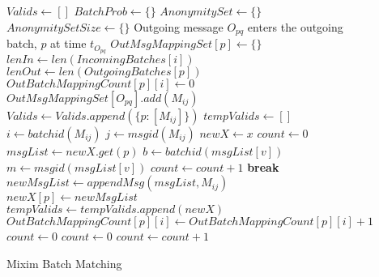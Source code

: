 \documentclass[twocolumn]{article}
\begin{document}
\begin{figure*}[p]
  \captionsetup{type=algorithm}
  \caption{Mixim Batch Matching}
  \begin{algorithmic}[1]
  \State $Valids \gets [] $
\State $BatchProb \gets \{ \} $
\State $ AnonymitySet \gets \{ \} $
\State $ AnonymitySetSize \gets \{ \} $
\State Outgoing message $O_{pq}$ enters the outgoing batch, $p$ at time $t_{O_{pq}}$
\State $OutMsgMappingSet [p] \gets \{ \} $
    \State $ lenIn \gets len(IncomingBatches[i]) $
    \State $ lenOut \gets len(OutgoingBatches[p]) $
        \State $OutBatchMappingCount[p][i] \gets 0 $
    \EndIf
\EndFor
{}
            \State $ OutMsgMappingSet[O_{pq}].add(M_{ij}) $
        \EndIf
    \EndFor
\EndFor
{}
        \State $Valids \gets Valids.append(\{ p: [M_{ij}] \} )$
    \EndFor
\Else
    \State $tempValids \gets []$
        \State $ i \gets batchid(M_{ij}) $
        \State $ j \gets msgid(M_{ij}) $
            \State $ newX \gets x $
            \State $count \gets 0$
            \State $ msgList \gets newX.get(p) $
                    \State $ b \gets batchid(msgList[v]) $
                    \State $ m \gets msgid(msgList[v]) $
                        \State $count \gets count + 1$
                    \Else
                        \State \textbf{break}
                    \EndIf
                \EndFor
                    \State $ newMsgList \gets appendMsg( msgList,M_{ij})$
                    \State $newX[p] \gets newMsgList $
                    \State $tempValids \gets tempValids.append(newX)$
                    \State $ OutBatchMappingCount[p][i] \gets OutBatchMappingCount[p][i] + 1$
                    \State $count \gets 0$
                \Else
                    \State $count \gets 0$
                \EndIf
            \Else
                        \State $count \gets count + 1$
  \end{algorithmic}
\end{figure*}
\end{document}
